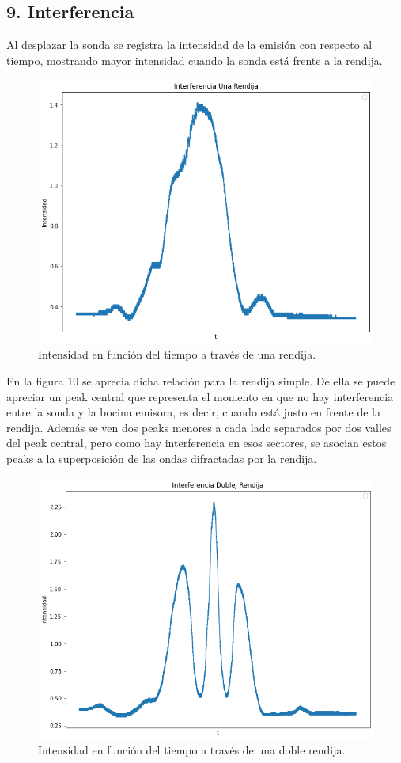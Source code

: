 \documentclass[a4paper,twocolumn,10pt]{article}
\begin{document}
\subsection*{9. Interferencia}
Al desplazar la sonda se registra la intensidad de la emisión con respecto al tiempo, mostrando mayor intensidad cuando la sonda está frente a la rendija. 
\begin{figure}[H]
    \centering
    \includegraphics[scale=.3]{PlotMOAnalisis/plot_una_rendija.png}
    \caption{Intensidad en función del tiempo a través de una rendija.}
\end{figure}

En la figura 10 se aprecia dicha relación para la rendija simple. De ella se puede apreciar un peak  central que representa el momento en que no hay interferencia entre la sonda y la bocina emisora, es decir, cuando está justo en frente de la rendija. Además se ven dos peaks menores a cada lado separados por dos valles del peak central, pero como hay interferencia en esos sectores, se asocian estos peaks a la superposición de las ondas difractadas por la rendija.
\begin{figure}[H]
    \centering
    \includegraphics[scale=.3]{PlotMOAnalisis/plot_doble_rendj.png}
    \caption{Intensidad en función del tiempo a través de una doble rendija.}
\end{figure}
\end{document}
